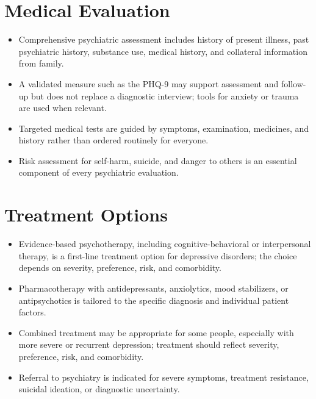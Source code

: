 \section*{Medical Evaluation}
\begin{itemize}
  \item Comprehensive psychiatric assessment includes history of present illness, past psychiatric history, substance use, medical history, and collateral information from family.
  \item A validated measure such as the PHQ-9 may support assessment and follow-up but does not replace a diagnostic interview; tools for anxiety or trauma are used when relevant.
  \item Targeted medical tests are guided by symptoms, examination, medicines, and history rather than ordered routinely for everyone.
  \item Risk assessment for self-harm, suicide, and danger to others is an essential component of every psychiatric evaluation.
\end{itemize}

\section*{Treatment Options}
\begin{itemize}
  \item Evidence-based psychotherapy, including cognitive-behavioral or interpersonal therapy, is a first-line treatment option for depressive disorders; the choice depends on severity, preference, risk, and comorbidity.
  \item Pharmacotherapy with antidepressants, anxiolytics, mood stabilizers, or antipsychotics is tailored to the specific diagnosis and individual patient factors.
  \item Combined treatment may be appropriate for some people, especially with more severe or recurrent depression; treatment should reflect severity, preference, risk, and comorbidity.
  \item Referral to psychiatry is indicated for severe symptoms, treatment resistance, suicidal ideation, or diagnostic uncertainty.
\end{itemize}

